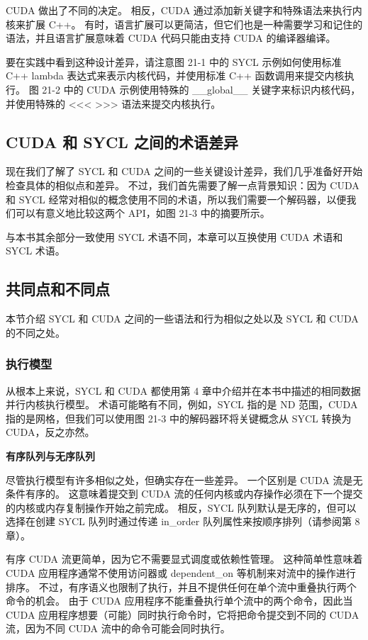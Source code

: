 CUDA 做出了不同的决定。 相反，CUDA 通过添加新关键字和特殊语法来执行内核来扩展 C++。 有时，语言扩展可以更简洁，但它们也是一种需要学习和记住的语法，并且语言扩展意味着 CUDA 代码只能由支持 CUDA 的编译器编译。

要在实践中看到这种设计差异，请注意图 21-1 中的 SYCL 示例如何使用标准 C++ lambda 表达式来表示内核代码，并使用标准 C++ 函数调用来提交内核执行。 图 21-2 中的 CUDA 示例使用特殊的 \_\_global\_\_ 关键字来标识内核代码，并使用特殊的 <<< >>> 语法来提交内核执行。

\subsection{CUDA 和 SYCL 之间的术语差异}
现在我们了解了 SYCL 和 CUDA 之间的一些关键设计差异，我们几乎准备好开始检查具体的相似点和差异。 不过，我们首先需要了解一点背景知识：因为 CUDA 和 SYCL 经常对相似的概念使用不同的术语，所以我们需要一个解码器，以便我们可以有意义地比较这两个 API，如图 21-3 中的摘要所示。

与本书其余部分一致使用 SYCL 术语不同，本章可以互换使用 CUDA 术语和 SYCL 术语。

\subsection{共同点和不同点}
本节介绍 SYCL 和 CUDA 之间的一些语法和行为相似之处以及 SYCL 和 CUDA 的不同之处。

\subsubsection{执行模型}
从根本上来说，SYCL 和 CUDA 都使用第 4 章中介绍并在本书中描述的相同数据并行内核执行模型。 术语可能略有不同，例如，SYCL 指的是 ND 范围，CUDA 指的是网格，但我们可以使用图 21-3 中的解码器环将关键概念从 SYCL 转换为 CUDA，反之亦然。

\textbf{有序队列与无序队列}

尽管执行模型有许多相似之处，但确实存在一些差异。 一个区别是 CUDA 流是无条件有序的。 这意味着提交到 CUDA 流的任何内核或内存操作必须在下一个提交的内核或内存复制操作开始之前完成。 相反，SYCL 队列默认是无序的，但可以选择在创建 SYCL 队列时通过传递 in\_order 队列属性来按顺序排列（请参阅第 8 章）。

有序 CUDA 流更简单，因为它不需要显式调度或依赖性管理。 这种简单性意味着 CUDA 应用程序通常不使用访问器或 dependent\_on 等机制来对流中的操作进行排序。 不过，有序语义也限制了执行，并且不提供任何在单个流中重叠执行两个命令的机会。 由于 CUDA 应用程序不能重叠执行单个流中的两个命令，因此当 CUDA 应用程序想要（可能）同时执行命令时，它将把命令提交到不同的 CUDA 流，因为不同 CUDA 流中的命令可能会同时执行。

